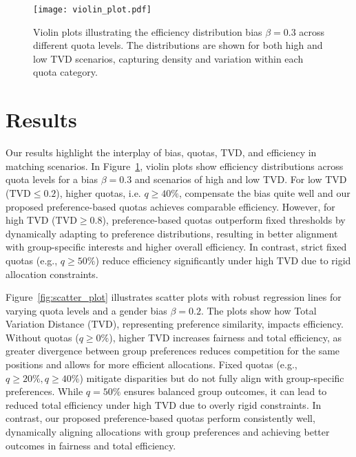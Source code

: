 \documentclass[letterpaper]{article}
\begin{document}
\begin{figure}[ht]

  \centering
  \texttt{[image: violin\_plot.pdf]}
\caption{Violin plots illustrating the efficiency distribution bias \( \beta = 0.3 \) across different quota levels. The distributions are shown for both high and low TVD scenarios, capturing density and variation within each quota category.}

  \label{fig:violin_plot}
\end{figure}

\section{Results}

Our results highlight the interplay of bias, quotas, TVD, and efficiency in matching scenarios.
In Figure~\ref{fig:violin_plot}, violin plots show efficiency distributions across quota levels for a bias \( \beta = 0.3 \) and scenarios of high and low TVD. For low TVD (\( \text{TVD} \leq 0.2 \)), higher quotas, i.e. \( q\geq 40\%\), compensate the bias quite well and our proposed preference-based quotas achieves comparable efficiency. However, for high TVD (\( \text{TVD} \geq 0.8 \)), preference-based quotas outperform fixed thresholds by dynamically adapting to preference distributions, resulting in better alignment with group-specific interests and higher overall efficiency. In contrast, strict fixed quotas (e.g., \( q \geq 50\% \)) reduce efficiency significantly under high TVD due to rigid allocation constraints.

Figure~\ref{fig:scatter_plot} illustrates scatter plots with robust regression lines for varying quota levels and a gender bias \( \beta = 0.2 \). The plots show how Total Variation Distance (TVD), representing preference similarity, impacts efficiency. Without quotas (\( q \geq 0\% \)), higher TVD increases fairness and total efficiency, as greater divergence between group preferences reduces competition for the same positions and allows for more efficient allocations. Fixed quotas (e.g., \( q \geq 20\%, q \geq 40\% \)) mitigate disparities but do not fully align with group-specific preferences. While \( q = 50\% \) ensures balanced group outcomes, it can lead to reduced total efficiency under high TVD due to overly rigid constraints. In contrast, our proposed preference-based quotas perform consistently well, dynamically aligning allocations with group preferences and achieving better outcomes in fairness and total efficiency.
\end{document}
